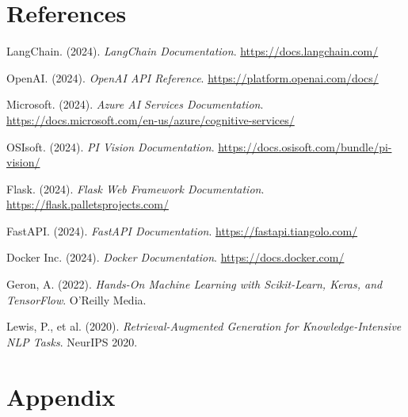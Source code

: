 \documentclass[12pt,a4paper]{report}
\begin{document}
\chapter*{References}

\begin{enumerate}[leftmargin=1.5cm, label={[\arabic*]}]
    \item LangChain. (2024). \textit{LangChain Documentation}. \url{https://docs.langchain.com/}
    \item OpenAI. (2024). \textit{OpenAI API Reference}. \url{https://platform.openai.com/docs/}
    \item Microsoft. (2024). \textit{Azure AI Services Documentation}. \url{https://docs.microsoft.com/en-us/azure/cognitive-services/}
    \item OSIsoft. (2024). \textit{PI Vision Documentation}. \url{https://docs.osisoft.com/bundle/pi-vision/}
    \item Flask. (2024). \textit{Flask Web Framework Documentation}. \url{https://flask.palletsprojects.com/}
    \item FastAPI. (2024). \textit{FastAPI Documentation}. \url{https://fastapi.tiangolo.com/}
    \item Docker Inc. (2024). \textit{Docker Documentation}. \url{https://docs.docker.com/}
    \item Geron, A. (2022). \textit{Hands-On Machine Learning with Scikit-Learn, Keras, and TensorFlow}. O'Reilly Media.
    \item Lewis, P., et al. (2020). \textit{Retrieval-Augmented Generation for Knowledge-Intensive NLP Tasks}. NeurIPS 2020.
    
\end{enumerate}

\newpage
\chapter*{Appendix}

\end{document}
